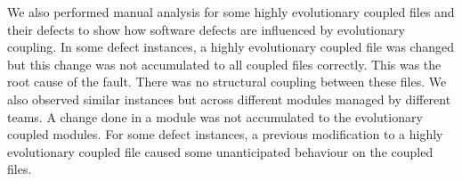 \documentclass[times]{smrauth}
\begin{document}







We also performed manual analysis for some highly evolutionary coupled files and their defects to show how software defects are influenced by evolutionary coupling. In some defect instances, a highly evolutionary coupled file was changed but this change was not accumulated to all coupled files correctly. This was the root cause of the fault. There was no structural coupling between these files. We also observed similar instances but across different modules managed by different teams. A change done in a module was not accumulated to the evolutionary coupled modules. For some defect instances, a previous modification to a highly evolutionary coupled file caused some unanticipated behaviour on the coupled files. 
\end{document}
